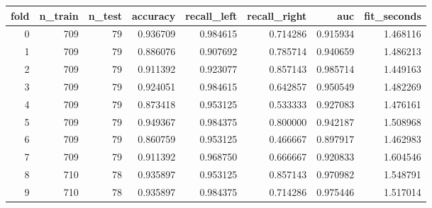 \begin{tabular}{rrrrrrrr}
\toprule
fold & n_train & n_test & accuracy & recall_left & recall_right & auc & fit_seconds \\
\midrule
0 & 709 & 79 & 0.936709 & 0.984615 & 0.714286 & 0.915934 & 1.468116 \\
1 & 709 & 79 & 0.886076 & 0.907692 & 0.785714 & 0.940659 & 1.486213 \\
2 & 709 & 79 & 0.911392 & 0.923077 & 0.857143 & 0.985714 & 1.449163 \\
3 & 709 & 79 & 0.924051 & 0.984615 & 0.642857 & 0.950549 & 1.482269 \\
4 & 709 & 79 & 0.873418 & 0.953125 & 0.533333 & 0.927083 & 1.476161 \\
5 & 709 & 79 & 0.949367 & 0.984375 & 0.800000 & 0.942187 & 1.508968 \\
6 & 709 & 79 & 0.860759 & 0.953125 & 0.466667 & 0.897917 & 1.462983 \\
7 & 709 & 79 & 0.911392 & 0.968750 & 0.666667 & 0.920833 & 1.604546 \\
8 & 710 & 78 & 0.935897 & 0.953125 & 0.857143 & 0.970982 & 1.548791 \\
9 & 710 & 78 & 0.935897 & 0.984375 & 0.714286 & 0.975446 & 1.517014 \\
\bottomrule
\end{tabular}
